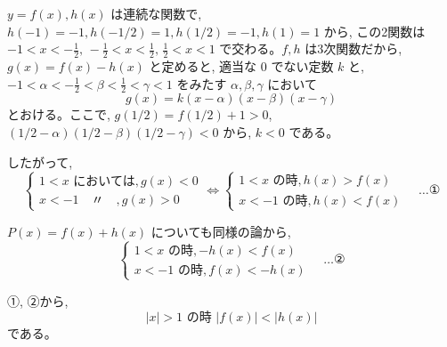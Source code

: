 \documentclass[../main.tex]{subfiles}
\begin{document}
$y=f(x), h(x)$ は連続な関数で, $h(-1)=-1, h(-1/2)=1, h(1/2)=-1, h(1)=1$ から, この2関数は $-1 < x < -\frac{1}{2}, \, -\frac{1}{2} < x < \frac{1}{2}, \, \frac{1}{2} < x < 1$ で交わる。$f, h$ は3次関数だから, $g(x) = f(x) - h(x)$ と定めると, 適当な $0$ でない定数 $k$ と, $-1 < \alpha < -\frac{1}{2} < \beta < \frac{1}{2} < \gamma < 1$ をみたす $\alpha, \beta, \gamma$ において
\[
  g(x) = k(x-\alpha)(x-\beta)(x-\gamma)
\]
とおける。ここで, $g(1/2) = f(1/2) + 1 > 0$, $(1/2-\alpha)(1/2-\beta)(1/2-\gamma) < 0$ から, $k < 0$ である。

したがって,
\[
  \begin{cases}
    1 < x \text{ においては}, g(x) < 0 \\
    x < -1 \quad \text{〃} \quad , g(x) > 0
  \end{cases}
  \iff
  \begin{cases}
    1 < x \text{ の時}, h(x) > f(x) \\
    x < -1 \text{ の時}, h(x) < f(x)
  \end{cases}
  \quad \dots \text{①}
\]

$P(x) = f(x) + h(x)$ についても同様の論から,
\[
  \begin{cases}
    1 < x \text{ の時}, -h(x) < f(x) \\
    x < -1 \text{ の時}, f(x) < -h(x)
  \end{cases}
  \quad \dots \text{②}
\]

①, ②から,
\[
  |x| > 1 \text{ の時 } |f(x)| < |h(x)|
\]
である。
\end{document}
